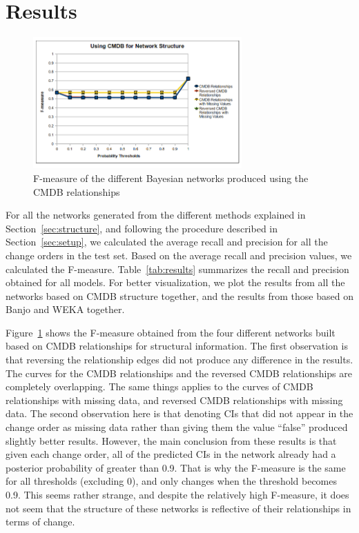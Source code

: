 \documentclass[10pt,twocolumn,letterpaper]{article}
\begin{document}
\section{Results}
\label{sec:results}

\begin{figure}[!t]
\centering
\includegraphics[width=8cm]{graphics/cmdbresults.png}
\caption{F-measure of the different Bayesian networks produced using the CMDB relationships}
\label{fig:cmdbresults}
\end{figure}

For all the networks generated from the different methods explained in Section~\ref{sec:structure}, and following the procedure described in
Section~\ref{sec:setup}, we calculated the average recall and precision for all the change orders in the test set. Based on the average recall and precision
values, we calculated the F-measure. Table~\ref{tab:results} summarizes the recall and precision obtained for all models. For better visualization, we plot the
results from all the networks based on CMDB structure together, and the results from those based on Banjo and WEKA together.

Figure~\ref{fig:cmdbresults} shows the F-measure obtained from the four different networks built based on CMDB relationships for structural information. The
first observation is that reversing the relationship edges did not produce any difference in the results. The curves for the CMDB relationships and the reversed
CMDB relationships are completely overlapping. The same things applies to the curves of CMDB relationships with missing data, and reversed CMDB relationships
with missing data. The second observation here is that denoting CIs that did not appear in the change order as missing data rather than giving them the value
``false'' produced slightly better results. However, the main conclusion from these results is that given each change order, all of the predicted CIs in the
network already had a posterior probability of greater than 0.9. That is why the F-measure is the same for all thresholds (excluding 0), and only
changes when the threshold becomes 0.9. This seems rather strange, and despite the relatively high F-measure, it does not seem that the structure
of these networks is reflective of their relationships in terms of change.
\end{document}
